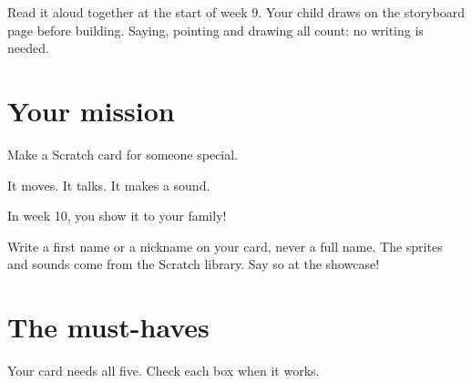 \documentclass[track=junior,level=1]{kidscode}
\begin{document}

\begin{grownup}
Read it aloud together at the start of week 9. Your child draws on the storyboard page
before building. Saying, pointing and drawing all count: no writing is needed.
\end{grownup}

\section{Your mission}
Make a Scratch card for someone special.\par
It moves. It talks. It makes a sound.\par
In week 10, you show it to your family!

\begin{safety}
Write a first name or a nickname on your card, never a full name.
The sprites and sounds come from the Scratch library. Say so at the showcase!
\end{safety}

\section{The must-haves}
Your card needs all five. Check each box when it works.
\end{document}
